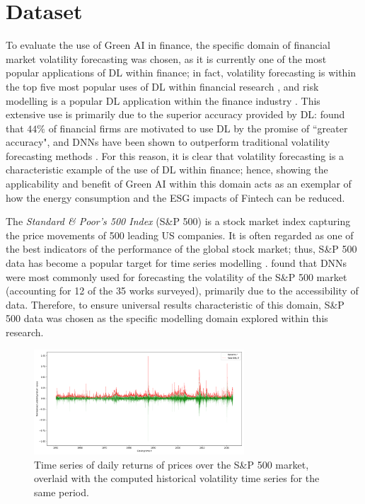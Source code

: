 \documentclass[a4paper, 11pt]{report}
\begin{document}
    \section{Dataset}
    \label{section: dataset}

    To evaluate the use of Green AI in finance, the specific domain of financial market volatility forecasting was chosen, as it is currently one of the most popular applications of DL within finance; in fact, volatility forecasting is within the top five most popular uses of DL within financial research \citep{sezer-2019}, and risk modelling is a popular DL application within the finance industry \citep{chartis-2019}. This extensive use is primarily due to the superior accuracy provided by DL: \citet{chartis-2019} found that $44\%$ of financial firms are motivated to use DL by the promise of ``greater accuracy", and DNNs have been shown to outperform traditional volatility forecasting methods \citep{rodikov-2022}. For this reason, it is clear that volatility forecasting is a characteristic example of the use of DL within finance; hence, showing the applicability and benefit of Green AI within this domain acts as an exemplar of how the energy consumption and the ESG impacts of Fintech can be reduced.


    The \emph{Standard \& Poor's 500 Index} (S\&P 500) is a stock market index capturing the price movements of 500 leading US companies. It is often regarded as one of the best indicators of the performance of the global stock market; thus, S\&P 500 data has become a popular target for time series modelling \citep{thakkar-2021}. \citet{ge-2022} found that DNNs were most commonly used for forecasting the volatility of the S\&P 500 market (accounting for 12 of the 35 works surveyed), primarily due to the accessibility of data. Therefore, to ensure universal results characteristic of this domain, S\&P 500 data was chosen as the specific modelling domain explored within this research.

    \begin{figure}[ht]
        \centering
        \includegraphics[width=0.7\textwidth]{volatility.png}
        \caption{\centering Time series of daily returns of prices over the S\&P 500 market, overlaid with the computed historical volatility time series for the same period.}
        \label{fig: ret-vol}
    \end{figure}
\end{document}
